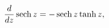 \[\frac{d}{dz}\mathop{\mathrm{sech}\/}\nolimits z=-\mathop{\mathrm{sech}\/}%
\nolimits z\mathop{\tanh\/}\nolimits z,\]